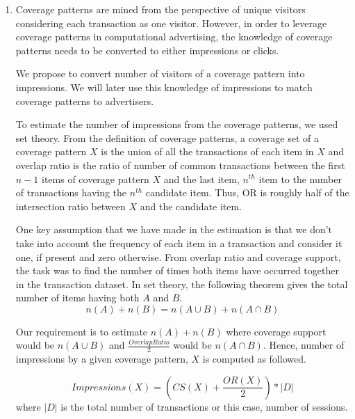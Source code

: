 \begin{enumerate}[label=(\Alph*)]

\item Coverage patterns are mined from the perspective of unique visitors considering each transaction as one visitor. However, in order to leverage coverage patterns in computational advertising, the knowledge of coverage patterns needs to be converted to either impressions or clicks. 

We propose to convert number of visitors of a coverage pattern into impressions. We will later use this knowledge of impressions to match coverage patterns to advertisers.

To estimate the number of impressions from the coverage patterns, we used set theory. From the definition of coverage patterns, a coverage set of a coverage pattern $X$ is the union of all the transactions of each item in $X$ and overlap ratio is the ratio of number of common transactions between the first $n-1$ items of coverage pattern $X$ and the last item, $n^{th}$ item to the number of transactions having the $n^{th}$ candidate item. Thus, OR is roughly half of the intersection ratio between $X$ and the candidate item. 

One key assumption that we have made in the estimation is that we don't take into account the frequency of each item in a transaction and consider it one, if present and zero otherwise. From overlap ratio and coverage support, the task was to find the number of times both items have occurred together in the transaction dataset. In set theory, the following theorem gives the total number of items having both $A$ and $B$.
\begin{equation}
 n(A) + n(B) = n(A \cup B) + n(A \cap B) 
\end{equation}

Our requirement is to estimate $n(A) + n(B)$ where coverage support would be $n(A \cup B)$ and $\frac{Overlap Ratio}{2}$ would be $n(A \cap B)$. Hence, number of impressions by a given coverage pattern, $X$ is computed as followed.

\begin{equation}
 Impressions(X) = (CS(X) + \frac{OR(X)}{2}) * |D| 
\end{equation}
where $|D|$ is the total number of transactions or this case, number of sessions.


\end{enumerate}
